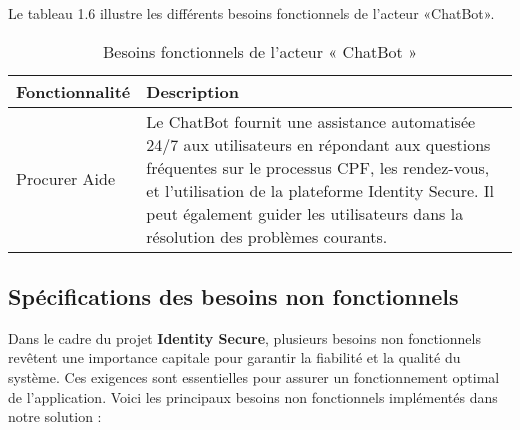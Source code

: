 Le tableau 1.6 illustre les différents besoins fonctionnels de l'acteur «ChatBot».
\begin{table}[H]
\centering
\caption{\centering Besoins fonctionnels de l'acteur « ChatBot »}
\label{tab:backlog:ch1:2}
\begin{tabular}
{| >{\centering\arraybackslash}p{4.2cm} | >{\centering\arraybackslash}p{12.5cm} |}
\rowcolor{gray!30}

\hline \textbf{Fonctionnalité} & \textbf{Description}\\
\hline Procurer Aide &  Le ChatBot fournit une assistance automatisée 24/7 aux utilisateurs en répondant aux questions fréquentes sur le processus CPF, les rendez-vous, et l'utilisation de la plateforme Identity Secure. Il peut également guider les utilisateurs dans la résolution des problèmes courants.\\
\hline
\end{tabular}
\end{table}
\subsection{Spécifications des besoins non fonctionnels}
Dans le cadre du projet \textbf{Identity Secure}, plusieurs besoins non fonctionnels revêtent une importance capitale pour garantir la fiabilité et la qualité du système. Ces exigences sont essentielles pour assurer un fonctionnement optimal de l'application. Voici les principaux besoins non fonctionnels implémentés dans notre solution :


